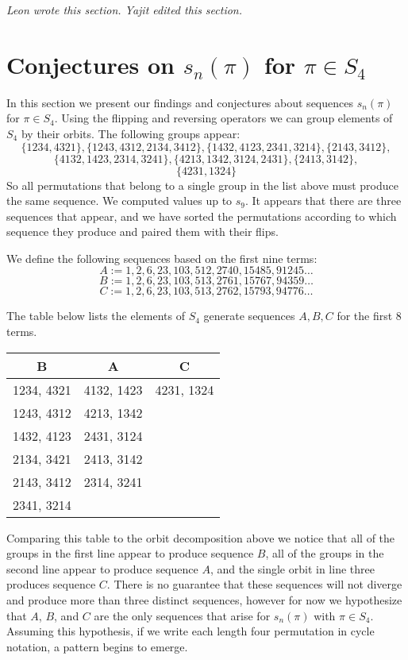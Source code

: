 \documentclass[11pt,letterpaper,twoside,english]{article}
\theoremstyle{theorem}
\theoremstyle{remark}
\begin{document}
\emph{Leon wrote this section. Yajit edited this section.}

\section{Conjectures on $s_n(\pi)$ for $\pi\in S_4$}
\label{S4}


In this section we present our findings and conjectures about sequences $s_n(\pi)$ for $\pi\in S_4$. Using the flipping and reversing operators we can group elements of $S_4$ by their orbits. The following groups appear: 
$$
\{1234,4321\},
\{1243,4312,2134,3412\},
\{1432,4123,2341,3214\},
\{2143,3412\},
$$
$$
\{4132,1423,2314,3241\},
\{4213,1342,3124,2431\},
\{2413,3142\},
$$
$$
\{4231,1324\}
$$
So all permutations that belong to a single group in the list above must produce the same sequence. 
We computed values up to $s_{9}$. It appears that there are three sequences that appear, and we have sorted the permutations according to which sequence they produce and paired them with their flips.  



We define the following sequences based on the first nine terms:
$$
A:=1,2,6,23,103,512,2740,15485,91245\ldots
$$
$$
B:=1,2,6,23,103,513,2761,15767,94359\ldots
$$
$$
C:=1,2,6,23,103,513,2762,15793,94776\ldots
$$

The table below lists the elements of $S_4$ generate sequences $A,B,C$ for the first 8 terms.

\begin{center}
\begin{tabular}{|c|c|c|}
B &A&C\\
\hline
1234, 4321&4132, 1423&4231, 1324\\
1243, 4312&4213, 1342&\\
1432, 4123&2431, 3124&\\
2134, 3421&2413, 3142&\\
2143, 3412&2314, 3241&\\
2341, 3214&&\\
\end{tabular}
\end{center}

Comparing this table to the orbit decomposition above we notice that all of the groups in the first line appear to produce sequence $B$, all of the groups in the second line appear to produce sequence $A$, and the single orbit in line three produces sequence $C$. There is no guarantee that these sequences will not diverge and produce more than three distinct sequences, however for now we hypothesize that $A$, $B$, and $C$ are the only sequences that arise for $s_n(\pi)$ with $\pi\in S_4$. Assuming this hypothesis, if we write each length four permutation in cycle notation, a pattern begins to emerge. 
\end{document}
